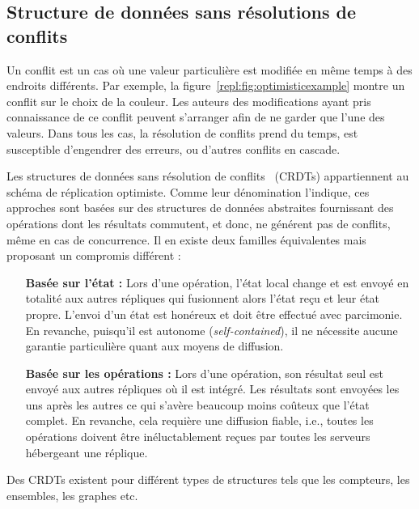 \subsection{Structure de données sans résolutions de conflits}
\label{repl:subsec:crdts}

Un conflit est un cas où une valeur particulière est modifiée en même temps à
des endroits différents. Par exemple, la figure~\ref{repl:fig:optimisticexample}
montre un conflit sur le choix de la couleur. Les auteurs des modifications
ayant pris connaissance de ce conflit peuvent s'arranger afin de ne garder que
l'une des valeurs. Dans tous les cas, la résolution de conflits prend du temps,
est susceptible d'engendrer des erreurs, ou d'autres conflits en cascade.

Les structures de données sans résolution de
conflits~\cite{shapiro2011comprehensive} (CRDTs) appartiennent au schéma de
réplication optimiste. Comme leur dénomination l'indique, ces approches sont
basées sur des structures de données abstraites fournissant des opérations dont
les résultats commutent, et donc, ne générent pas de conflits, même en cas de
concurrence.  Il en existe deux familles équivalentes mais proposant un
compromis différent :
\begin{itemize}
\item [\textbf{Basée sur l'état :}] Lors d'une opération, l'état local change et
  est envoyé en totalité aux autres répliques qui fusionnent alors l'état reçu
  et leur état propre. L'envoi d'un état est honéreux et doit être effectué avec
  parcimonie. En revanche, puisqu'il est autonome (\emph{self-contained}), il ne
  nécessite aucune garantie particulière quant aux moyens de diffusion.
\item [\textbf{Basée sur les opérations :}] Lors d'une opération, son résultat
  seul est envoyé aux autres répliques où il est intégré. Les résultats sont
  envoyées les uns après les autres ce qui s'avère beaucoup moins coûteux que
  l'état complet. En revanche, cela requière une diffusion fiable, i.e., toutes
  les opérations doivent être inéluctablement reçues par toutes les serveurs
  hébergeant une réplique.
\end{itemize}

Des CRDTs existent pour différent types de structures tels que les compteurs,
les ensembles, les graphes etc.


